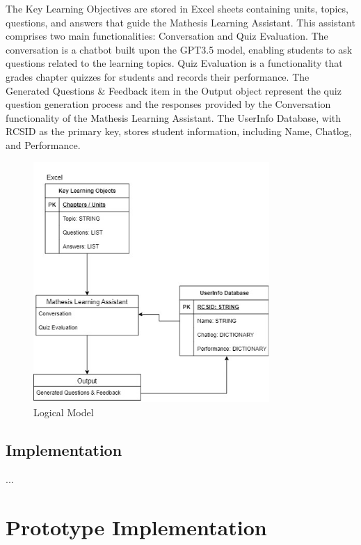 \documentclass[12pt,a4paper]{article}
\begin{document}
    The Key Learning Objectives are stored in Excel sheets containing units, topics, questions, and answers that guide the Mathesis Learning Assistant. This assistant comprises two main functionalities: Conversation and Quiz Evaluation. The conversation is a chatbot built upon the GPT3.5 model, enabling students to ask questions related to the learning topics. Quiz Evaluation is a functionality that grades chapter quizzes for students and records their performance. The Generated Questions \& Feedback item in the Output object represent the quiz question generation process and the responses provided by the Conversation functionality of the Mathesis Learning Assistant. The UserInfo Database, with RCSID as the primary key, stores student information, including Name, Chatlog, and Performance. 
    \begin{figure}[h]
        \centering
        \includegraphics[width=0.8\textwidth]{Logical_diagram.jpg}
        \caption{Logical Model}
        \label{fig:GPT Pedagpgy}
    \end{figure}
    
    \subsection{Implementation}
    ...

    \section{Prototype Implementation}
\end{document}
